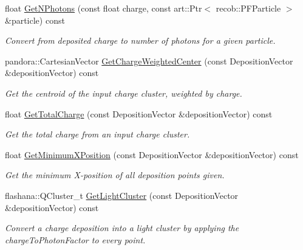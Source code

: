 \begin{DoxyCompactItemize}
\item 
float \hyperlink{classflashmatch_1_1FlashMatchingTool_1_1SliceCandidate_afb395be111f9204e915540af8075b932}{Get\-N\-Photons} (const float charge, const art\-::\-Ptr$<$ recob\-::\-P\-F\-Particle $>$ \&particle) const 
\begin{DoxyCompactList}\small\item\em Convert from deposited charge to number of photons for a given particle. \end{DoxyCompactList}\item 
pandora\-::\-Cartesian\-Vector \hyperlink{classflashmatch_1_1FlashMatchingTool_1_1SliceCandidate_ad7fc44d86307d95f09e6c0a4b9803f13}{Get\-Charge\-Weighted\-Center} (const Deposition\-Vector \&deposition\-Vector) const 
\begin{DoxyCompactList}\small\item\em Get the centroid of the input charge cluster, weighted by charge. \end{DoxyCompactList}\item 
float \hyperlink{classflashmatch_1_1FlashMatchingTool_1_1SliceCandidate_aca3c0c940b20610851ca460bb4a2f7c5}{Get\-Total\-Charge} (const Deposition\-Vector \&deposition\-Vector) const 
\begin{DoxyCompactList}\small\item\em Get the total charge from an input charge cluster. \end{DoxyCompactList}\item 
float \hyperlink{classflashmatch_1_1FlashMatchingTool_1_1SliceCandidate_a0b008482a71be1eb335c369430e1981a}{Get\-Minimum\-X\-Position} (const Deposition\-Vector \&deposition\-Vector) const 
\begin{DoxyCompactList}\small\item\em Get the minimum X-\/position of all deposition points given. \end{DoxyCompactList}\item 
flashana\-::\-Q\-Cluster\-\_\-t \hyperlink{classflashmatch_1_1FlashMatchingTool_1_1SliceCandidate_ad7c3f60dd664894ab1fb37cd4b47fdb6}{Get\-Light\-Cluster} (const Deposition\-Vector \&deposition\-Vector) const 
\begin{DoxyCompactList}\small\item\em Convert a charge deposition into a light cluster by applying the charge\-To\-Photon\-Factor to every point. \end{DoxyCompactList}\end{DoxyCompactItemize}


